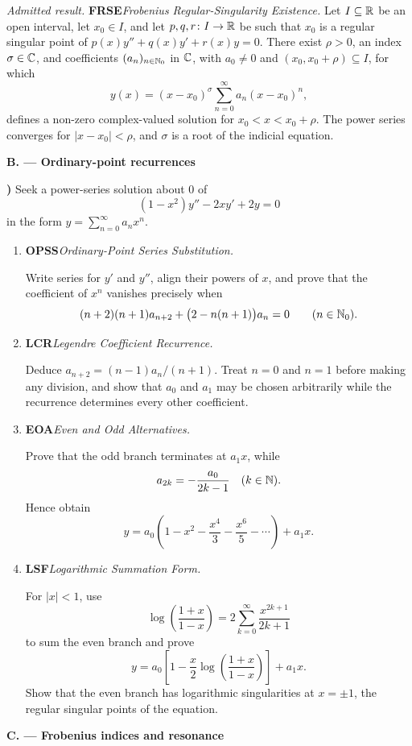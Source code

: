 \documentclass[10pt,a4paper]{article}
\newcounter{examquestion}
\newcommand{\examquestion}[1]{%
  \Needspace{5\baselineskip}%
  \refstepcounter{examquestion}%
  \par\addvspace{0.8\baselineskip}%
  \noindent\textbf{\theexamquestion)}\enspace #1\par
}
\newenvironment{subquestions}
  {\begin{enumerate}[label=\alph*),leftmargin=2.1em]}
  {\end{enumerate}}
\newcommand{\nameditem}[2]{%
  \textbf{\textsf{#1}}\enspace\emph{#2.}\enspace
}
\newcommand{\admitted}[3]{%
  \par\smallskip\noindent\emph{Admitted result.}\enspace
  \nameditem{#1}{#2}#3\par
}
\newcommand{\subpart}[1]{%
  \begin{center}
    \textbf{#1}
  \end{center}
}
\begin{document}
\admitted{FRSE}{Frobenius Regular-Singularity Existence}{Let
$I\subseteq\mathbb{R}$ be an open interval, let $x_0\in I$, and let
$p,q,r\colon I\to\mathbb{R}$ be such that $x_0$ is a regular singular point of
$p(x)y''+q(x)y'+r(x)y=0$.  There exist $\rho>0$, an index $\sigma\in\mathbb{C}$,
and coefficients $(a_n)_{n\in\mathbb{N}_0}$ in $\mathbb{C}$, with $a_0\ne0$ and
$(x_0,x_0+\rho)\subseteq I$, for which
\[
 y(x)=(x-x_0)^\sigma\sum_{n=0}^{\infty}a_n(x-x_0)^n,
\]
defines a non-zero complex-valued solution for $x_0<x<x_0+\rho$.  The power
series converges for $|x-x_0|<\rho$, and $\sigma$ is a root of the indicial
equation.}

\subpart{B. --- Ordinary-point recurrences}

\examquestion{\label{q:legendre-series}
Seek a power-series solution about $0$ of
\[
  (1-x^2)y''-2xy'+2y=0
\]
in the form $y=\sum_{n=0}^{\infty}a_nx^n$.
\begin{subquestions}
  \item \nameditem{OPSS}{Ordinary-Point Series Substitution}
  Write series for $y'$ and $y''$, align their powers of $x$, and prove that
  the coefficient of $x^n$ vanishes precisely when
  \[
    (n+2)(n+1)a_{n+2}+\bigl(2-n(n+1)\bigr)a_n=0
    \qquad(n\in\mathbb{N}_0).
  \]

  \item \nameditem{LCR}{Legendre Coefficient Recurrence}
  Deduce
  $a_{n+2}=(n-1)a_n/(n+1)$.  Treat $n=0$ and $n=1$ before making any
  division, and show that $a_0$ and $a_1$ may be chosen arbitrarily while
  the recurrence determines every other coefficient.

  \item \nameditem{EOA}{Even and Odd Alternatives}
  Prove that the odd branch terminates at $a_1x$, while
  \[
    a_{2k}=-\frac{a_0}{2k-1}\quad(k\in\mathbb{N}).
  \]
  Hence obtain
  \[
    y=a_0\left(1-x^2-\frac{x^4}{3}-\frac{x^6}{5}-\cdots\right)+a_1x.
  \]

  \item \nameditem{LSF}{Logarithmic Summation Form}
  For $|x|<1$, use
  \[
    \log\left(\frac{1+x}{1-x}\right)
      =2\sum_{k=0}^{\infty}\frac{x^{2k+1}}{2k+1}
  \]
  to sum the even branch and prove
  \[
    y=a_0\left[1-\frac{x}{2}\log\left(\frac{1+x}{1-x}\right)\right]+a_1x.
  \]
  Show that the even branch has logarithmic singularities at $x=\pm1$, the
  regular singular points of the equation.
\end{subquestions}}

\subpart{C. --- Frobenius indices and resonance}
\end{document}
